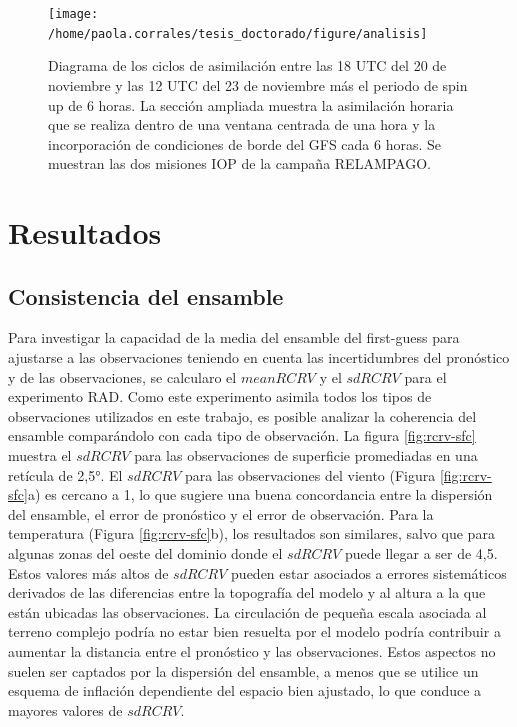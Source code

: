 \documentclass[12pt,oneside,a4paper]{reedthesis}
\begin{document}
\begin{figure}
\texttt{[image: /home/paola.corrales/tesis\_doctorado/figure/analisis]} \caption{Diagrama de los ciclos de asimilación entre las 18 UTC del 20 de noviembre y las 12 UTC del 23 de noviembre más el periodo de spin up de 6 horas. La sección ampliada muestra la asimilación horaria que se realiza dentro de una ventana centrada de una hora y la incorporación de condiciones de borde del GFS cada 6 horas. Se muestran las dos misiones IOP de la campaña RELAMPAGO.}\label{fig:cycle}
\end{figure}
\hypertarget{resultados}{%
\section{Resultados}\label{resultados}}

\hypertarget{consistencia-del-ensamble}{%
\subsection{Consistencia del ensamble}\label{consistencia-del-ensamble}}

Para investigar la capacidad de la media del ensamble del first-guess para ajustarse a las observaciones teniendo en cuenta las incertidumbres del pronóstico y de las observaciones, se calcularo el \(meanRCRV\) y el \(sdRCRV\) para el experimento RAD. Como este experimento asimila todos los tipos de observaciones utilizados en este trabajo, es posible analizar la coherencia del ensamble comparándolo con cada tipo de observación. La figura \ref{fig:rcrv-sfc} muestra el \(sdRCRV\) para las observaciones de superficie promediadas en una retícula de 2,5°. El \(sdRCRV\) para las observaciones del viento (Figura \ref{fig:rcrv-sfc}a) es cercano a 1, lo que sugiere una buena concordancia entre la dispersión del ensamble, el error de pronóstico y el error de observación. Para la temperatura (Figura \ref{fig:rcrv-sfc}b), los resultados son similares, salvo que para algunas zonas del oeste del dominio donde el \(sdRCRV\) puede llegar a ser de 4,5. Estos valores más altos de \(sdRCRV\) pueden estar asociados a errores sistemáticos derivados de las diferencias entre la topografía del modelo y al altura a la que están ubicadas las observaciones. La circulación de pequeña escala asociada al terreno complejo podría no estar bien resuelta por el modelo podría contribuir a aumentar la distancia entre el pronóstico y las observaciones. Estos aspectos no suelen ser captados por la dispersión del ensamble, a menos que se utilice un esquema de inflación dependiente del espacio bien ajustado, lo que conduce a mayores valores de \(sdRCRV\).
\end{document}
